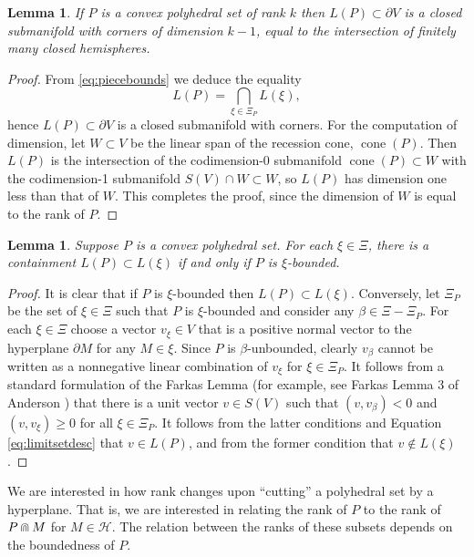 \documentclass[11pt]{amsart}
\newtheorem{lemma}[theorem]{Lemma}
\numberwithin{table}{section}
\numberwithin{figure}{section}
\theoremstyle{remark}
\DeclareMathOperator{\cone}{cone}
\begin{document}
\begin{lemma}\label{lem:limitdim}
  If $P$ is a convex polyhedral set of rank $k$ then
  $L(P)\subset \partial V$ is a closed submanifold with corners of
  dimension $k-1$, equal to the intersection of finitely many closed
  hemispheres.
\end{lemma}
\begin{proof}
  From \cref{eq:piecebounds} we deduce the equality
  \begin{equation} \label{eq:limitsetdesc}
    L(P) = \bigcap_{\xi\in \Xi_P} L(\xi),
  \end{equation}
  hence $L(P) \subset \partial V$ is a closed submanifold with
  corners. For the computation of dimension, let $W \subset V$ be the
  linear span of the recession cone, $\cone(P)$. Then $L(P)$ is the
  intersection of the codimension-0 submanifold $\cone(P) \subset W$
  with the codimension-1 submanifold $S(V) \cap W \subset W$, so
  $L(P)$ has dimension one less than that of $W$. This completes the
  proof, since the dimension of $W$ is equal to the rank of $P$.
\end{proof}


\begin{lemma} \label{lem:unboundeddirection} Suppose $P$ is a convex
  polyhedral set. For each $\xi\in \Xi$, there is a containment
  $L(P)\subset L(\xi)$ if and only if $P$ is $\xi$-bounded.
\end{lemma}
\begin{proof}
  It is clear that if $P$ is $\xi$-bounded then $L(P)\subset
  L(\xi)$. Conversely, let $\Xi_P$ be the set of $\xi\in \Xi$ such
  that $P$ is $\xi$-bounded and consider any $\beta \in \Xi -
  \Xi_P$. For each $\xi\in \Xi$ choose a vector $v_\xi\in V$ that is a
  positive normal vector to the hyperplane $\partial M$ for any
  $M\in \xi$. Since $P$ is $\beta$-unbounded, clearly $v_\beta$ cannot
  be written as a nonnegative linear combination of $v_\xi$ for
  $\xi\in \Xi_P$.  It follows from a standard formulation of the
  Farkas Lemma (for example, see Farkas Lemma 3 of Anderson
  \cite[\S1.5.2, page 30]{Anderson}) that there is a unit vector
  $v\in S(V)$ such that $(v,v_\beta) < 0$ and $(v,v_\xi) \geq 0$ for
  all $\xi\in \Xi_P$. It follows from the latter conditions and
  Equation \cref{eq:limitsetdesc} that $v\in L(P)$, and from the former
  condition that $v\notin L(\xi)$.
\end{proof}

We are interested in how rank changes upon ``cutting'' a polyhedral
set by a hyperplane. That is, we are interested in relating the rank
of $P$ to the rank of $P\doublecap M$ for $M\in \mathcal{H}$. The relation
between the ranks of these subsets depends on the boundedness of $P$.
\end{document}
